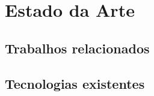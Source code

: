 \chapter{Estado da Arte}
\label{sec:2-EstadoArte}



\section{Trabalhos relacionados}



\section{Tecnologias existentes}

